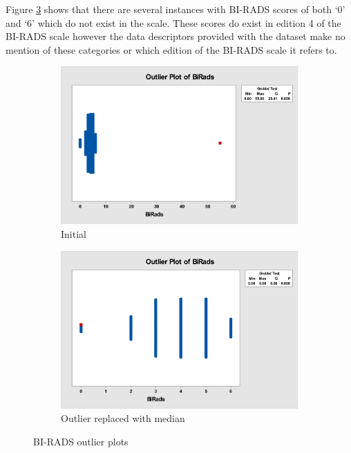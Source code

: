 \documentclass[12pt]{article}
\begin{document}
        Figure \ref{fig:birads-outilier-no55} shows that there are several instances with BI-RADS scores of both ‘0’ and ‘6’ which do not exist in the scale. These scores do exist in edition 4 of the BI-RADS scale \citep{d2003breast} however the data descriptors provided with the dataset make no mention of these categories or which edition of the BI-RADS scale it refers to.

        \begin{figure}[H]
          \begin{subfigure}[b]{0.45\textwidth}
            \includegraphics[width=\textwidth]{birads-outlier-plot}
            \caption{Initial}
            \label{fig:birads-outlier}
          \end{subfigure}
          \hfill
          \begin{subfigure}[b]{0.45\textwidth}
            \includegraphics[width=\textwidth]{birads-outlier-plot-no55}
            \caption{Outlier replaced with median}
            \label{fig:birads-outilier-no55}
          \end{subfigure}
          \caption{BI-RADS outlier plots}
        \end{figure}
\end{document}
